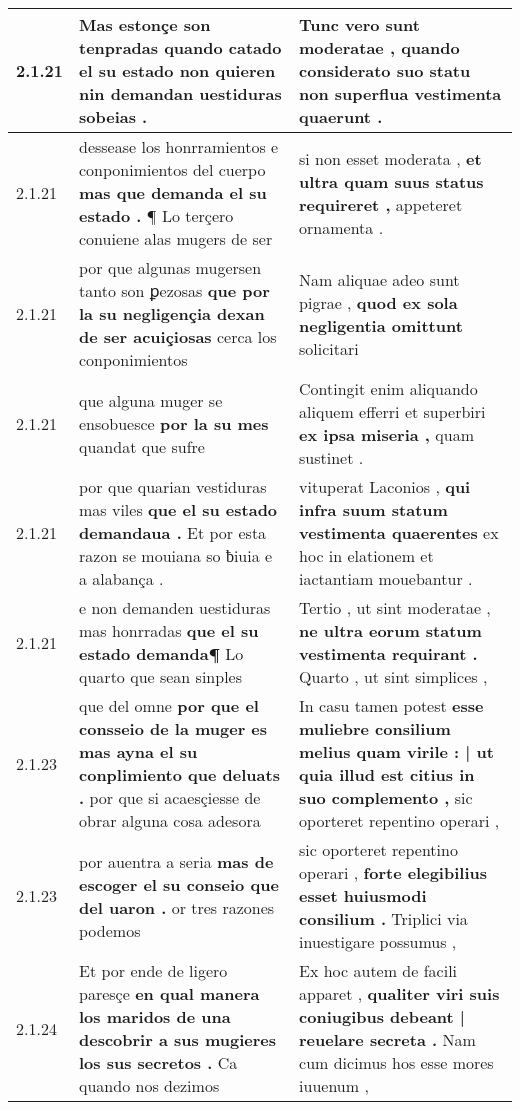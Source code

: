 \begin{tabular}{|p{1cm}|p{6.5cm}|p{6.5cm}|}
2.1.21 & Mas estonçe son tenpradas \textbf{ quando catado el su estado non quieren } nin demandan uestiduras sobeias . & Tunc vero sunt moderatae , \textbf{ quando considerato suo statu } non superflua vestimenta quaerunt . \\\hline
2.1.21 & dessease los honrramientos e conponimientos del cuerpo \textbf{ mas que demanda el su estado . } ¶ Lo terçero conuiene alas mugers de ser & si non esset moderata , \textbf{ et ultra quam suus status requireret , } appeteret ornamenta . \\\hline
2.1.21 & por que algunas mugersen tanto son ꝑezosas \textbf{ que por la su negligençia dexan de ser acuiçiosas } cerca los conponimientos & Nam aliquae adeo sunt pigrae , \textbf{ quod ex sola negligentia omittunt } solicitari \\\hline
2.1.21 & que alguna muger se ensobuesce \textbf{ por la su mes } quandat que sufre & Contingit enim aliquando aliquem efferri et superbiri \textbf{ ex ipsa miseria , } quam sustinet . \\\hline
2.1.21 & por que quarian vestiduras mas viles \textbf{ que el su estado demandaua . } Et por esta razon se mouiana so ƀiuia e a alabança . & vituperat Laconios , \textbf{ qui infra suum statum vestimenta quaerentes } ex hoc in elationem et iactantiam mouebantur . \\\hline
2.1.21 & e non demanden uestiduras mas honrradas \textbf{ que el su estado demanda¶ } Lo quarto que sean sinples & Tertio , ut sint moderatae , \textbf{ ne ultra eorum statum vestimenta requirant . } Quarto , ut sint simplices , \\\hline
2.1.23 & que del omne \textbf{ por que el consseio de la muger es mas ayna el su conplimiento que deluats . } por que si acaesçiesse de obrar alguna cosa adesora & In casu tamen potest \textbf{ esse muliebre consilium melius quam virile : | ut quia illud est citius in suo complemento , } sic oporteret repentino operari , \\\hline
2.1.23 & por auentra a seria \textbf{ mas de escoger el su conseio que del uaron . } or tres razones podemos & sic oporteret repentino operari , \textbf{ forte elegibilius esset huiusmodi consilium . } Triplici via inuestigare possumus , \\\hline
2.1.24 & Et por ende de ligero paresçe \textbf{ en qual manera los maridos de una descobrir a sus mugieres los sus secretos . } Ca quando nos dezimos & Ex hoc autem de facili apparet , \textbf{ qualiter viri suis coniugibus debeant | reuelare secreta . } Nam cum dicimus hos esse mores iuuenum , \\\hline

\end{tabular}

